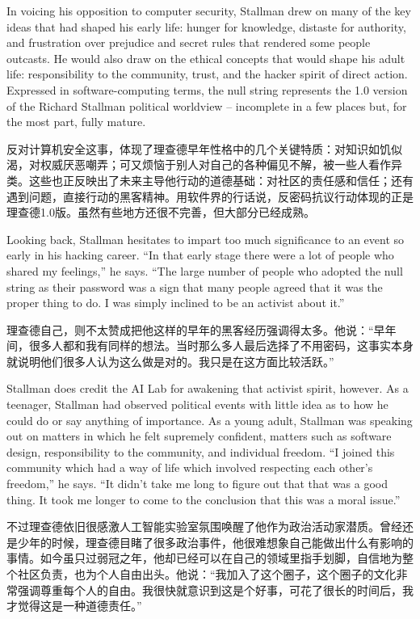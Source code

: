 \ifdefined\eng
In voicing his opposition to computer security, Stallman drew on many of the key ideas that had shaped his early life: hunger for knowledge, distaste for authority, and frustration over prejudice and secret rules that rendered some people outcasts. He would also draw on the ethical concepts that would shape his adult life: responsibility to the community, trust, and the hacker spirit of direct action. Expressed in software-computing terms, the null string represents the 1.0 version of the Richard Stallman political worldview -- incomplete in a few places but, for the most part, fully mature.
\fi

\ifdefined\chs
反对计算机安全这事，体现了理查德早年性格中的几个关键特质：对知识如饥似渴，对权威厌恶嘲弄；可又烦恼于别人对自己的各种偏见不解，被一些人看作异类。这些也正反映出了未来主导他行动的道德基础：对社区的责任感和信任；还有遇到问题，直接行动的黑客精神。用软件界的行话说，反密码抗议行动体现的正是理查德1.0版。虽然有些地方还很不完善，但大部分已经成熟。
\fi

\ifdefined\eng
Looking back, Stallman hesitates to impart too much significance to an event so early in his hacking career. ``In that early stage there were a lot of people who shared my feelings,'' he says. ``The large number of people who adopted the null string as their password was a sign that many people agreed that it was the proper thing to do. I was simply inclined to be an activist about it.''
\fi

\ifdefined\chs
理查德自己，则不太赞成把他这样的早年的黑客经历强调得太多。他说：``早年间，很多人都和我有同样的想法。当时那么多人最后选择了不用密码，这事实本身就说明他们很多人认为这么做是对的。我只是在这方面比较活跃。''
\fi

\ifdefined\eng
Stallman does credit the AI Lab for awakening that activist spirit, however. As a teenager, Stallman had observed political events with little idea as to how he could do or say anything of importance. As a young adult, Stallman was speaking out on matters in which he felt supremely confident, matters such as software design, responsibility to the community, and individual freedom. ``I joined this community which had a way of life which involved respecting each other's freedom,'' he says. ``It didn't take me long to figure out that that was a good thing. It took me longer to come to the conclusion that this was a moral issue.''
\fi

\ifdefined\chs
不过理查德依旧很感激人工智能实验室氛围唤醒了他作为政治活动家潜质。曾经还是少年的时候，理查德目睹了很多政治事件，他很难想象自己能做出什么有影响的事情。如今虽只过弱冠之年，他却已经可以在自己的领域里指手划脚，自信地为整个社区负责，也为个人自由出头。他说：``我加入了这个圈子，这个圈子的文化非常强调尊重每个人的自由。我很快就意识到这是个好事，可花了很长的时间后，我才觉得这是一种道德责任。''
\fi

